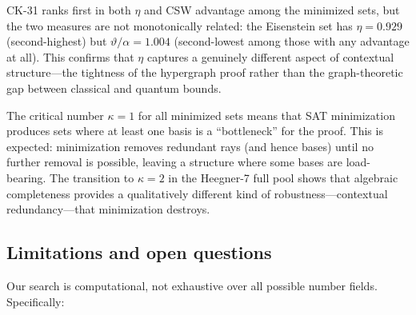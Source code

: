 \documentclass[12pt,a4paper]{article}
\begin{document}
CK-31 ranks first in both $\eta$ and CSW advantage among the minimized sets, but the two measures are not monotonically related: the Eisenstein set has $\eta = 0.929$ (second-highest) but $\vartheta/\alpha = 1.004$ (second-lowest among those with any advantage at all). This confirms that $\eta$ captures a genuinely different aspect of contextual structure---the tightness of the hypergraph proof rather than the graph-theoretic gap between classical and quantum bounds.

The critical number $\kappa = 1$ for all minimized sets means that SAT minimization produces sets where at least one basis is a ``bottleneck'' for the proof. This is expected: minimization removes redundant rays (and hence bases) until no further removal is possible, leaving a structure where some bases are load-bearing. The transition to $\kappa = 2$ in the Heegner-7 full pool shows that algebraic completeness provides a qualitatively different kind of robustness---contextual redundancy---that minimization destroys.

\subsection{Limitations and open questions}

Our search is computational, not exhaustive over all possible number fields. Specifically:
\end{document}
